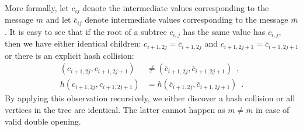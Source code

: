 \documentclass{crypto-exercise}
\begin{document}
\begin{solution}
More formally, let $c_{ij}$ denote the intermediate values corresponding to the message $m$ and let $\overline{c}_{ij}$ denote intermediate values corresponding to the message $\overline{m}$. It is easy to see that if the root of a subtree $c_{i,j}$ has the same value has $\overline{c}_{i,j}$, then we have either identical children: $c_{i+1,2j}=\overline{c}_{i+1,2j}$ and $c_{i+1,2j+1}=\overline{c}_{i+1,2j+1}$ or there is an explicit hash collision:
\begin{align*}
(c_{i+1,2j}, c_{i+1,2j+1})&\neq (\overline{c}_{i+1,2j}, \overline{c}_{i+1,2j+1})\enspace,\\
h(c_{i+1,2j}, c_{i+1,2j+1})&=h(\overline{c}_{i+1,2j}, \overline{c}_{i+1,2j+1})\enspace.
\end{align*}
By applying this observation recursively, we either discover a hash collision or all vertices in the tree are identical. The latter cannot happen as $m\neq\overline{m}$ in case of valid double opening.


\end{solution}
\end{document}
